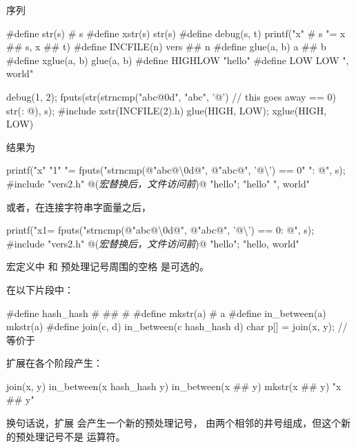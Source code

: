     \pnum
    \begin{example}
    序列
    \begin{codeblock}
    #define str(s)      # s
    #define xstr(s)     str(s)
    #define debug(s, t) printf("x" # s "= %
                   x ## s, x ## t)
    #define INCFILE(n)  vers ## n
    #define glue(a, b)  a ## b
    #define xglue(a, b) glue(a, b)
    #define HIGHLOW     "hello"
    #define LOW         LOW ", world"
    
    debug(1, 2);
    fputs(str(strncmp("abc@\textbackslash@0d", "abc", '@')        // this goes away
        == 0) str(: @\atsign\textbackslash@n), s);
    #include xstr(INCFILE(2).h)
    glue(HIGH, LOW);
    xglue(HIGH, LOW)
    \end{codeblock}
    结果为
    \begin{codeblock}
    printf("x" "1" "= %
    fputs("strncmp(@\textbackslash@"abc@\textbackslash\textbackslash@0d@\textbackslash@", @\textbackslash@"abc@\textbackslash@", '@\textbackslash{}') == 0" ": @\atsign\textbackslash@n", s);
    #include "vers2.h"      @\textrm{(\textit{宏替换后，文件访问前})}@
    "hello";
    "hello" ", world"
    \end{codeblock}
    或者，在连接字符串字面量之后，
    \begin{codeblock}
    printf("x1= %
    fputs("strncmp(@\textbackslash@"abc@\textbackslash\textbackslash@0d@\textbackslash@", @\textbackslash@"abc@\textbackslash@", '@\textbackslash{}') == 0: @\atsign\textbackslash@n", s);
    #include "vers2.h"      @\textrm{(\textit{宏替换后，文件访问前})}@
    "hello";
    "hello, world"
    \end{codeblock}
    
    宏定义中 \tcode{\#} 和 \tcode{\#\#} 预处理记号周围的空格
    是可选的。
    \end{example}
    
    \pnum
    \begin{example}
    在以下片段中：
    
    \begin{codeblock}
    #define hash_hash # ## #
    #define mkstr(a) # a
    #define in_between(a) mkstr(a)
    #define join(c, d) in_between(c hash_hash d)
    char p[] = join(x, y);          // 等价于 
    \end{codeblock}
    
    扩展在各个阶段产生：
    
    \begin{codeblock}
    join(x, y)
    in_between(x hash_hash y)
    in_between(x ## y)
    mkstr(x ## y)
    "x ## y"
    \end{codeblock}
    
    换句话说，扩展  会产生一个新的预处理记号，
    由两个相邻的井号组成，但这个新的预处理记号不是
    \tcode{\#\#} 运算符。
    \end{example}
    
